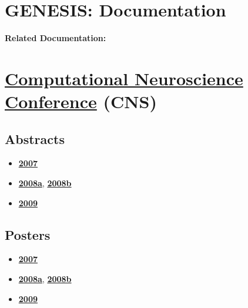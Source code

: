 \documentclass[12pt]{article}
\begin{document}
\section*{GENESIS: Documentation}

{\bf Related Documentation:}

\section*{\href{http://www.cnsorg.org/meetings/}{Computational Neuroscience Conference} (CNS)}

\subsection*{Abstracts}

\begin{itemize}
\item \href{../cns07/BMCNeurosci.8.S2.P4.pdf}{\bf 2007}
\item \href{../cns08/BMCNeurosci.9.S1.P88.pdf}{\bf 2008a}, \href{../cns08/BMCNeurosci.9.S1.P87.pdf}{\bf 2008b}
\item \href{../cns09/BMCNeurosci.10.S1.P52.pdf}{\bf 2009}
\end{itemize}

\subsection*{Posters}

\begin{itemize}
\item \href{../cns07/poster07.pdf}{\bf 2007}
\item \href{../cns08/poster08a.pdf}{\bf 2008a}, \href{../cns08/poster08.pdf}{\bf 2008b}
\item \href{../cns09/poster09.pdf}{\bf 2009}
\end{itemize}
\end{document}
